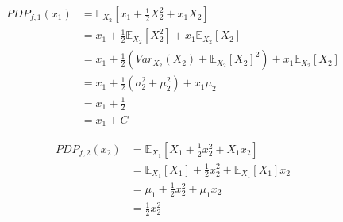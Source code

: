 \documentclass[runningheads]{llncs}
\begin{document}
\begin{align*}
    PDP_{f,1}(x_1) &= \mathbb{E}_{X_2}[x_1 + \frac{1}{2}X_2^2 + x_1 X_2] \\
                 &= x_1 + \frac{1}{2} \mathbb{E}_{X_2}[X_2^2] + x_1 \mathbb{E}_{X_2}[X_2] \\
                 &= x_1 + \frac{1}{2} (Var_{X_2}(X_2) + \mathbb{E}_{X_2}[X_2]^2) + x_1 \mathbb{E}_{X_2}[X_2] \\
                 &= x_1 + \frac{1}{2} (\sigma_2^2 + \mu_2^2) + x_1 \mu_2 \\
                 &= x_1 + \frac{1}{2} \\
                 &= x_1 + C
\end{align*}

\begin{align*}
    PDP_{f,2}(x_2) &= \mathbb{E}_{X_1}[X_1 + \frac{1}{2}x_2^2 + X_1 x_2] \\
                    &= \mathbb{E}_{X_1}[X_1] + \frac{1}{2}x_2^2 + \mathbb{E}_{X_1}[X_1] x_2 \\
                    &= \mu_1 + \frac{1}{2}x_2^2 + \mu_1 x_2 \\
                    &= \frac{1}{2}x_2^2
\end{align*}
\end{document}
